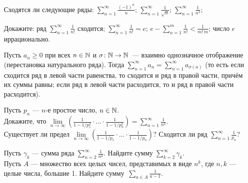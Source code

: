 \documentclass[a4paper,12pt]{article}
\begin{document}

Сходятся ли следующие
ряды:
$\sum\limits_{n=1}^\infty \frac{(-1)^n}{n}$;
$\sum\limits_{n=1}^\infty \frac1{\sqrt{n}}$;
$\sum\limits_{n=1}^\infty \frac1{n^2}$;




Докажите:
ряд $\sum\limits_{n=1}^\infty \frac1{n!}$ сходится;
$\sum\limits_{n=1}^\infty \frac1{n!}=e$;
$e-\sum\limits_{n=1}^m \frac1{n!}<\frac1{m!\,m}$;
число $e$ иррационально.

Пусть $a_n\geqslant0$ при всех $n\in\mathbb{N}$ и $\sigma\colon\mathbb{N}\rightarrow\mathbb{N}$~---
взаимно однозначное отображение (перестановка натурального
ряда). Тогда $\sum\limits_{n=1}^{\infty}a_n=
\sum\limits_{n=1}^{\infty}a_{\sigma(n)}$ (то есть
если сходится ряд в левой части равенства, то сходится и ряд в правой
части, прич\"ем их суммы равны; если ряд в левой части расходится,
то и ряд в правой части расходится).


Пусть $p_n$ --- $n$-е простое число, $n\in\mathbb{N}$.
\\
Докажите, что
$\lim\limits_{n\rightarrow\infty}
\left(\frac1{1-1/p_1^2}\cdot\ldots\cdot\frac1{1-1/p_n^2}\right)=
\sum\limits_{n=1}^\infty \frac1{n^2}$.\\
 Существует ли предел
$\lim\limits_{n\rightarrow\infty}
\left(\frac1{1-1/p_1}\cdot\ldots\cdot\frac1{1-1/p_n}\right)?$
 Сходится ли ряд
$\sum\limits_{n=1}^\infty \frac1{p_n}$?


Пусть $\gamma_k$ --- сумма ряда
$\sum\limits_{n=2}^{\infty}\frac1{n^k}$.
Найдите сумму $\sum\limits_{k=2}^{\infty}\gamma_k$.\\
Пусть $A$ --- множество всех целых
чисел, представимых в виде $n^k$, где $n,k$ --- %
целые числа, большие 1.
Найдите сумму~\hbox{$\sum\limits_{a\in A}\frac1{a-1}$.}

\end{document}

